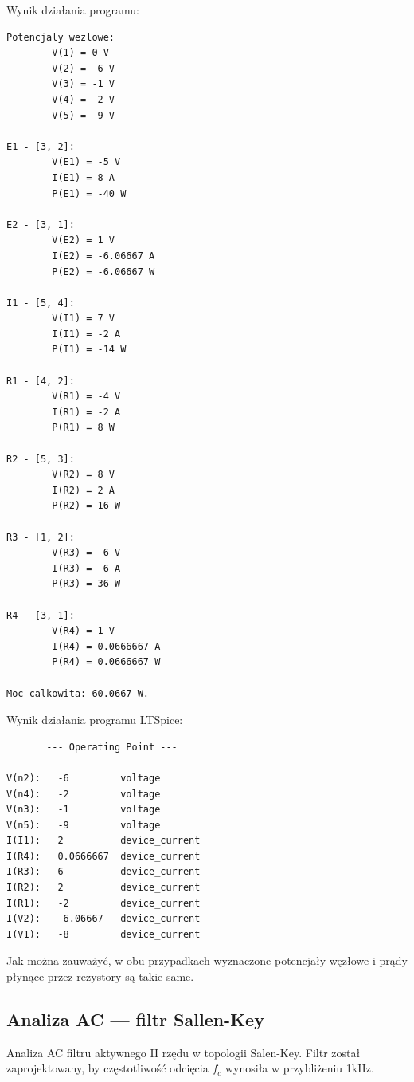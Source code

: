 \documentclass[11pt, final]{article}
\begin{document}
\noindent Wynik działania programu:
\begin{lstlisting}
Potencjaly wezlowe:
        V(1) = 0 V
        V(2) = -6 V
        V(3) = -1 V
        V(4) = -2 V
        V(5) = -9 V
 
E1 - [3, 2]:
        V(E1) = -5 V
        I(E1) = 8 A
        P(E1) = -40 W
 
E2 - [3, 1]:
        V(E2) = 1 V
        I(E2) = -6.06667 A
        P(E2) = -6.06667 W
 
I1 - [5, 4]:
        V(I1) = 7 V
        I(I1) = -2 A
        P(I1) = -14 W
 
R1 - [4, 2]:
        V(R1) = -4 V
        I(R1) = -2 A
        P(R1) = 8 W
 
R2 - [5, 3]:
        V(R2) = 8 V
        I(R2) = 2 A
        P(R2) = 16 W
 
R3 - [1, 2]:
        V(R3) = -6 V
        I(R3) = -6 A
        P(R3) = 36 W
 
R4 - [3, 1]:
        V(R4) = 1 V
        I(R4) = 0.0666667 A
        P(R4) = 0.0666667 W
 
Moc calkowita: 60.0667 W.
\end{lstlisting}
\noindent Wynik działania programu LTSpice:
\begin{lstlisting}
       --- Operating Point ---
 
V(n2):   -6         voltage
V(n4):   -2         voltage
V(n3):   -1         voltage
V(n5):   -9         voltage
I(I1):   2          device_current
I(R4):   0.0666667  device_current
I(R3):   6          device_current
I(R2):   2          device_current
I(R1):   -2         device_current
I(V2):   -6.06667   device_current
I(V1):   -8         device_current
\end{lstlisting}

\noindent Jak można zauważyć, w obu przypadkach wyznaczone potencjały węzłowe i prądy płynące przez rezystory są takie same.

\newpage
{} 
\subsection{Analiza AC --- filtr Sallen-Key}
Analiza AC filtru aktywnego II rzędu w topologii Salen-Key. Filtr został zaprojektowany\cite{okawa}, by częstotliwość odcięcia $f_c$ wynosiła w przybliżeniu 1kHz.
\end{document}
